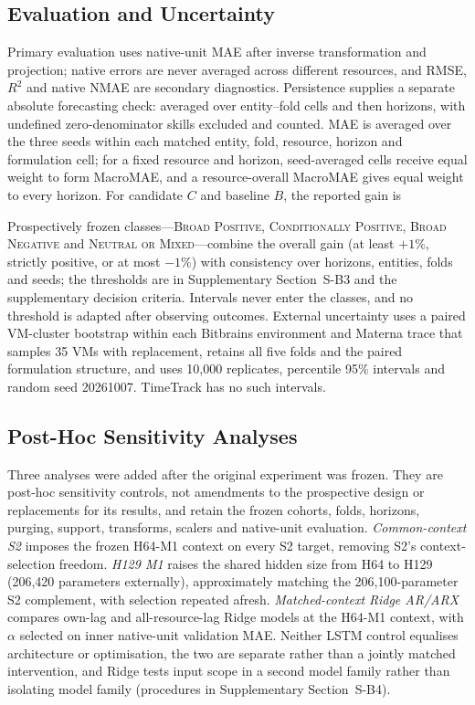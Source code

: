 \subsection{Evaluation and Uncertainty}
\label{sec:evaluation}

Primary evaluation uses native-unit MAE after inverse transformation and
projection; native errors are never averaged across different resources, and
RMSE, $R^2$ and native NMAE are secondary diagnostics. Persistence supplies a
separate absolute forecasting check:
averaged over entity--fold cells and then horizons, with undefined
zero-denominator skills excluded and counted. MAE is averaged over the three
seeds within each matched entity, fold, resource, horizon and formulation
cell; for a fixed resource and horizon, seed-averaged cells receive equal
weight to form MacroMAE, and a resource-overall MacroMAE gives equal weight to
every horizon. For candidate $C$ and baseline $B$, the reported gain is

Prospectively frozen classes---\textsc{Broad Positive},
\textsc{Conditionally Positive}, \textsc{Broad Negative} and
\textsc{Neutral or Mixed}---combine the overall gain (at least $+1\%$,
strictly positive, or at most $-1\%$) with consistency over horizons,
entities, folds and seeds; the thresholds are in Supplementary
Section~S-B3 and the supplementary decision criteria. Intervals never enter
the classes, and no threshold is adapted after observing outcomes. External
uncertainty uses a paired VM-cluster bootstrap within each Bitbrains
environment and Materna trace that samples 35 VMs with replacement, retains
all five folds and the paired formulation structure, and uses 10,000
replicates, percentile 95\% intervals and random seed 20261007. TimeTrack has
no such intervals.

\subsection{Post-Hoc Sensitivity Analyses}
\label{sec:posthoc-controls}

Three analyses were added after the original experiment was frozen. They are
post-hoc sensitivity controls, not amendments to the prospective design or
replacements for its results, and retain the frozen cohorts, folds, horizons,
purging, support, transforms, scalers and native-unit evaluation.
\emph{Common-context S2} imposes the frozen H64-M1 context on every S2 target,
removing S2's context-selection freedom. \emph{H129 M1} raises the shared
hidden size from H64 to H129 (206,420 parameters externally), approximately
matching the 206,100-parameter S2 complement, with selection repeated afresh.
\emph{Matched-context Ridge AR/ARX} compares own-lag and all-resource-lag
Ridge models at the H64-M1 context, with $\alpha$ selected on inner
native-unit validation MAE. Neither LSTM control equalises architecture or
optimisation, the two are separate rather than a jointly matched
intervention, and Ridge tests input scope in a second model family rather
than isolating model family (procedures in Supplementary Section~S-B4).

